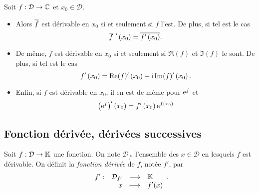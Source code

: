 \documentclass{magnolia}
\begin{document}
\begin{proposition}[utile=-3]
Soit $f:\mathcal{D}\to\mathbb{C}$ et $x_0\in\mathcal{D}$.
\begin{itemize}
\item Alors $\overline{f}$ est dérivable en $x_0$ si et seulement si $f$ l'est. De
  plus, si tel est le cas
  \[\conj{f}\ '\p{x_0}=\conj{f'\p{x_0}}.\]
\item De même, $f$ est dérivable en $x_0$ si et seulement si $\Re(f)$ et
  $\Im(f)$ le sont. De plus, si tel est le cas
  \[f'\left(x_0\right)=\mathop{\rm Re}(f)'\left(x_0\right)+{\rm i}\mathop{\rm Im}(f)'\left(x_0\right).\]
\item Enfin, si $f$ est dérivable en $x_0$, il en est de même pour ${\rm e}^f$ et
  \[\left({\rm e}^f\right)'\left(x_0\right)=f'\left(x_0\right){\rm e}^{f\left(x_0\right)}\]
\end{itemize}
\end{proposition}





\subsection{Fonction dérivée, dérivées successives}

\begin{definition}[utile=-3]
Soit $f:\mathcal{D}\to\mathbb{K}$ une fonction. On note $\mathcal{D}_{f'}$
l'ensemble des $x\in\mathcal{D}$ en lesquels $f$ est dérivable.
On définit la \emph{fonction dérivée} de $f$, notée
$f'$, par
\[\begin{array}[t]{lrcl} \displaystyle{f'} : & \displaystyle{\mathcal{D}_{f'}} & \longrightarrow & \displaystyle{\ensuremath{\mathbb{K}}} \\ & \displaystyle{x} & \longmapsto & \displaystyle{f'(x)} \end{array}.\]
\end{definition}

\end{document}
